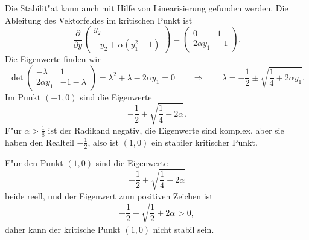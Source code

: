 \begin{loesung}
Die Stabilit"at kann auch mit Hilfe von Linearisierung gefunden
werden.
Die Ableitung des Vektorfeldes im kritischen Punkt ist
\[
\frac{\partial}{\partial y}
\begin{pmatrix}
y_2\\
-y_2+\alpha(y_1^2-1)
\end{pmatrix}
=
\begin{pmatrix}
   0        & 1\\
2\alpha y_1 &-1
\end{pmatrix}.
\]
Die Eigenwerte finden wir 
\[
\det
\begin{pmatrix}
   -\lambda & 1\\
2\alpha y_1 &-1-\lambda
\end{pmatrix}
=\lambda^2+\lambda -2\alpha y_1=0
\qquad\Rightarrow\qquad
\lambda = -\frac12\pm\sqrt{\frac14+2\alpha y_1}.
\]
Im Punkt $(-1,0)$ sind die Eigenwerte
\[
-\frac12\pm\sqrt{\frac14-2\alpha}.
\]
F"ur $\alpha > \frac18$ ist der Radikand negativ, die Eigenwerte
sind komplex, aber sie haben den Realteil $-\frac12$, also ist
$(1,0)$ ein stabiler kritischer Punkt.

F"ur den Punkt $(1,0)$ sind die Eigenwerte
\[
-\frac12\pm\sqrt{\frac14+2\alpha}
\]
beide reell, und der Eigenwert zum positiven Zeichen ist
\[
-\frac12 + \sqrt{\frac12 + 2\alpha} > 0,
\]
daher kann der kritische Punkt $(1,0)$ nicht stabil sein.
\end{loesung}

